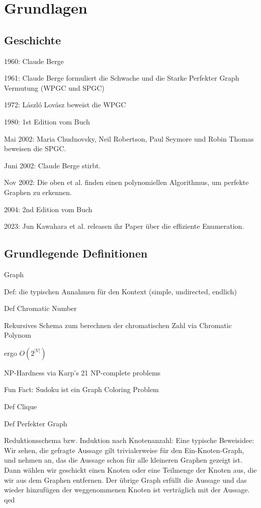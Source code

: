 \documentclass[../main.tex]{subfiles}
\begin{document}
\chapter{Grundlagen}
\label{chapter:grundlagen}

\section{Geschichte}
\label{section:geschichte}

1960: Claude Berge

1961: Claude Berge formuliert die Schwache und die Starke Perfekter Graph Vermutung (WPGC und SPGC)

1972: László Lovász beweist die WPGC

1980: 1st Edition vom Buch

Mai 2002: Maria Chudnovsky, Neil Robertson, Paul Seymore und Robin Thomas beweisen die SPGC.

Juni 2002: Claude Berge stirbt.

Nov 2002: Die oben et al. finden einen polynomiellen Algorithmus, um perfekte Graphen zu erkennen.

2004: 2nd Edition vom Buch\cite{das_Buch}

2023: Jun Kawahara et al. releasen ihr Paper über die effiziente Enumeration.

\section{Grundlegende Definitionen}
\label{section:definitionen}

\begin{definition}
    Graph
\end{definition}

Def: die typischen Annahmen für den Kontext (simple, undirected, endlich)

Def Chromatic Number

Rekursives Schema zum berechnen der chromatischen Zahl via Chromatic Polynom

ergo $O(2^{|V|})$

NP-Hardness via Karp's 21 NP-complete problems

Fun Fact: Sudoku ist ein Graph Coloring Problem

Def Clique

Def Perfekter Graph

Reduktionsschema bzw. Induktion nach Knotenanzahl:
    Eine typische Beweisidee: Wir sehen, die gefragte Aussage gilt trivialerweise für den Ein-Knoten-Graph, und nehmen an, das die Aussage schon für alle kleineren Graphen gezeigt ist. Dann wählen wir geschickt einen Knoten oder eine Teilmenge der Knoten aus, die wir aus dem Graphen entfernen. Der übrige Graph erfüllt die Aussage und das wieder hinzufügen der weggenommenen Knoten ist verträglich mit der Aussage. qed
\end{document}
